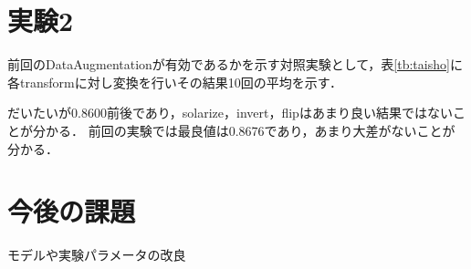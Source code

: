 \documentclass[twocolumn]{jarticle}     %
\begin{document}
\section{実験2}
前回のDataAugmentationが有効であるかを示す対照実験として，表\ref{tb:taisho}に各transformに対し変換を行いその結果10回の平均を示す．

だいたいが0.8600前後であり，solarize，invert，flipはあまり良い結果ではないことが分かる．
前回の実験では最良値は0.8676であり，あまり大差がないことが分かる．

\section{今後の課題}
モデルや実験パラメータの改良
\end{document}
